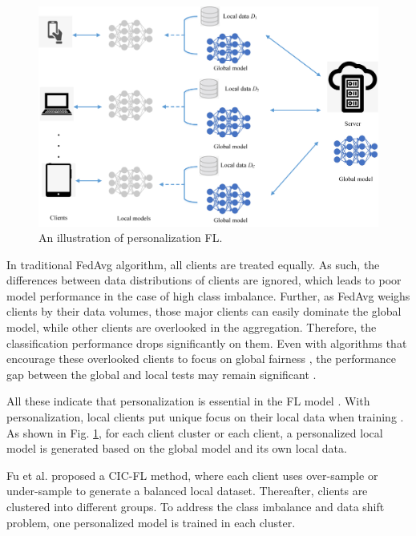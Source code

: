 \documentclass[10pt,journal,compsoc]{IEEEtran}
\begin{document}
\begin{figure}[h]
\centering
\setlength{\abovecaptionskip}{-0.2cm}
\includegraphics[scale=0.5]{personality.png}
\caption{An illustration of personalization FL. }
\label{personalization}
\end{figure}

In traditional FedAvg algorithm, all clients are treated equally. As such, the differences between data distributions of clients are ignored, which leads to poor model performance in the case of high class imbalance. Further, as FedAvg weighs clients by their data volumes, those major clients can easily dominate the global model, while other clients are overlooked in the aggregation. Therefore, the classification performance drops significantly on them. Even with algorithms that encourage these overlooked clients to focus on global fairness \cite{mohri2019agnostic} \cite{li2019fair}, the performance gap between the global and local tests may remain significant \cite{jiang2019improving}. 

All these indicate that personalization is essential in the FL model \cite{chou2022grp}. With personalization, local clients put unique focus on their local data when training \cite{fallah2020personalized} \cite{khodak2019adaptive} \cite{liang2020think}. As shown in Fig. \ref{personalization}, for each client cluster or each client, a personalized local model is generated based on the global model and its own local data.

Fu et al. \cite{fu2021cic} proposed a CIC-FL method, where each client uses over-sample or under-sample to generate a balanced local dataset. Thereafter, clients are clustered into different groups. To address the class imbalance and data shift problem, one personalized model is trained in each cluster. 
\end{document}
